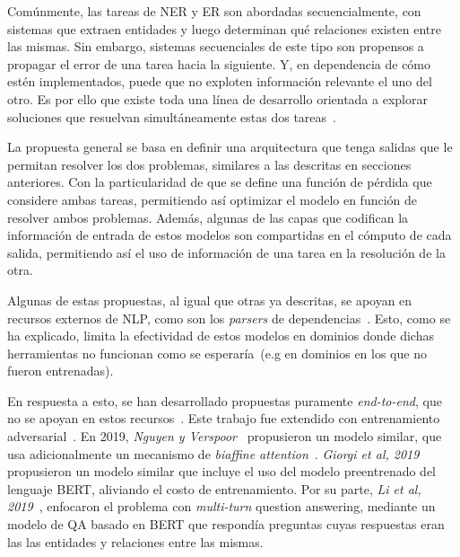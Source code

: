 Comúnmente, las tareas de NER y ER son abordadas secuencialmente, con sistemas que extraen entidades y luego determinan qué relaciones existen entre las mismas.
Sin embargo, sistemas secuenciales de este tipo son propensos a propagar el error de una tarea hacia la siguiente.
Y, en dependencia de cómo estén implementados, puede que no exploten información relevante el uno del otro.
Es por ello que existe toda una línea de desarrollo orientada a explorar soluciones que resuelvan simultáneamente estas dos tareas~\cite{miwa2016end, li2017neural, bekoulis2018adversarial, bekoulis2018joint, li2019entity, nguyen2019end, giorgi2019end}.

La propuesta general se basa en definir una arquitectura que tenga salidas que le permitan resolver los dos problemas, similares a las descritas en secciones anteriores.
Con la particularidad de que se define una función de pérdida que considere ambas tareas, permitiendo así optimizar el modelo en función de resolver ambos problemas.
Además, algunas de las capas que codifican la información de entrada de estos modelos son compartidas en el cómputo de cada salida, permitiendo así el uso de información de una tarea en la resolución de la otra.

Algunas de estas propuestas, al igual que otras ya descritas, se apoyan en recursos externos de NLP, como son los \textit{parsers} de dependencias~\cite{miwa2016end, li2017neural}.
Esto, como se ha explicado, limita la efectividad de estos modelos en dominios donde dichas herramientas no funcionan como se esperaría~(e.g en dominios en los que no fueron entrenadas).

En respuesta a esto, se han desarrollado propuestas puramente \textit{end-to-end}, que no se apoyan en estos recursos~\cite{bekoulis2018joint}.
Este trabajo fue extendido con entrenamiento adversarial~\cite{bekoulis2018adversarial}.
En 2019, \textit{Nguyen y Verspoor}~\cite{nguyen2019end} propusieron un modelo similar, que usa adicionalmente un mecanismo de \textit{biaffine attention}~\cite{biaffineattention}.
\textit{Giorgi et al, 2019}~\cite{giorgi2019end} propusieron un modelo similar que incluye el uso del modelo preentrenado del lenguaje BERT, aliviando el costo de entrenamiento.
Por su parte, \textit{Li et al, 2019}~\cite{li2019entity}, enfocaron el problema con \textit{multi-turn} question answering, mediante un modelo de QA basado en BERT que respondía preguntas cuyas respuestas eran las las entidades y relaciones entre las mismas.

